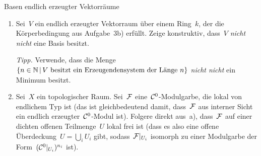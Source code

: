 \documentclass{pizzablatt}
\begin{document}
\begin{aufgabe}{Basen endlich erzeugter Vektorräume}
\begin{enumerate}
\item Sei~$V$ ein endlich erzeugter Vektorraum über einem Ring~$k$, der die Körperbedingung aus
Aufgabe~3b) erfüllt. Zeige konstruktiv, dass~$V$ \emph{nicht nicht} eine Basis
besitzt.

\emph{Tipp.} Verwende, dass die Menge~$\{ n \in \mathbb{N} \,|\, \text{$V$ besitzt ein
Erzeugendensystem der Länge~$n$} \}$ \emph{nicht nicht} ein Minimum
besitzt.

\item Sei~$X$ ein topologischer Raum. Sei~$\mathcal{F}$ eine~$\mathcal{C}^0$-Modulgarbe, die
lokal von endlichem Typ ist (das ist gleichbedeutend damit, dass~$\mathcal{F}$ aus
interner Sicht ein endlich erzeugter~$\mathcal{C}^0$-Modul ist). Folgere direkt aus~a),
dass~$\mathcal{F}$ auf einer dichten offenen Teilmenge~$U$ lokal frei ist (dass es also
eine offene Überdeckung~$U = \bigcup_i U_i$ gibt, sodass~$\mathcal{F}|_{U_i}$ isomorph
zu einer Modulgarbe der Form~$(\mathcal{C}^0|_{U_i})^{n_i}$ ist).
\end{enumerate}
\end{aufgabe}
\end{document}
